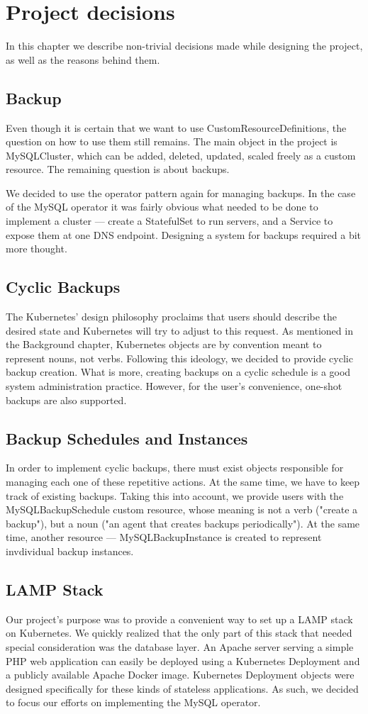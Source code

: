 \chapter{Project decisions}
In this chapter we describe non-trivial decisions made while designing the project, as well as the
reasons behind them.

\section{Backup}
Even though it is certain that we want to use CustomResourceDefinitions, the question on how to
use them still remains. The main object in the project is MySQLCluster, which can be added,
deleted, updated, scaled freely as a custom resource. The remaining question is about backups.

We decided to use the operator pattern again for managing backups. In the case of the MySQL
operator it was fairly obvious what needed to be done to implement a cluster --- create a
StatefulSet to run servers, and a Service to expose them at one DNS endpoint. Designing a system
for backups required a bit more thought.

\section{Cyclic Backups}
The Kubernetes’ design philosophy proclaims that users should describe the desired state and
Kubernetes will try to adjust to this request. As mentioned in the Background chapter, Kubernetes 
objects are by convention meant to represent nouns, not verbs. Following this ideology, we 
decided to provide cyclic backup creation. What is more, creating backups on a cyclic schedule 
is a good system administration practice. However, for the user’s convenience, one-shot backups are 
also supported.

\section{Backup Schedules and Instances}
In order to implement cyclic backups, there must exist objects responsible for managing each one of
these repetitive actions. At the same time, we have to keep track of existing backups. Taking this
into account, we provide users with the MySQLBackupSchedule custom resource, whose meaning is not a
verb ("create a backup"), but a noun ("an agent that creates backups periodically"). At the same
time, another resource --- MySQLBackupInstance is created to represent invdividual backup instances.

\section{LAMP Stack}
Our project’s purpose was to provide a convenient way to set up a LAMP
stack on Kubernetes. We quickly realized that the only part of this stack that needed special
consideration was the database layer. An Apache server serving a simple PHP web application can
easily be deployed using a Kubernetes Deployment and a publicly available Apache Docker image.
Kubernetes Deployment objects were designed specifically for these kinds of stateless applications.
As such, we decided to focus our efforts on implementing the MySQL operator.
